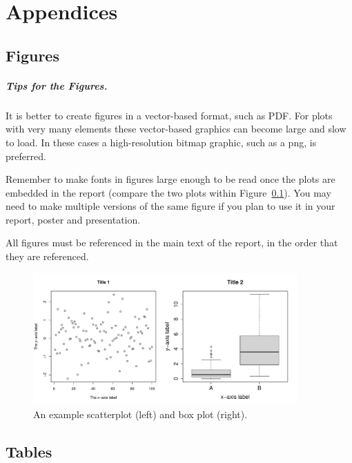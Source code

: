 \chapter*{Appendices}

\section{Figures}\label{sec:figuresection}

\paragraph{Tips for the Figures.} It is better to create figures in a vector-based format, such as PDF. For plots with very many elements these vector-based graphics can become large and slow to load. In these cases a high-resolution bitmap graphic, such as a png, is preferred. 

Remember to make fonts in figures large enough to be read once the plots are embedded in the report (compare the two plots within Figure~\ref{fig:axis-label-example}). You may need to make multiple versions of the same figure if you plan to use it in your report, poster and presentation.

All figures must be referenced in the main text of the report, in the order that they are referenced.

\begin{figure}[htbp]
    \centering
    \includegraphics[width=0.9\textwidth]{assets/fig1.pdf}
    \caption{An example scatterplot (left) and box plot (right).}
    \label{fig:axis-label-example}
\end{figure}

\section{Tables}\label{sec:tablesection}

